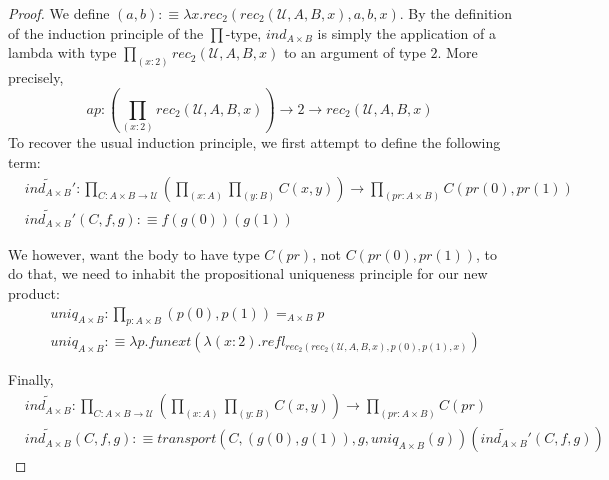 \documentclass{article}
\begin{document}
\begin{proof}
  We define $(a,b) :\equiv \lambda x . rec_2(rec_2(\mathcal{U}, A, B, x), a, b, x)$.
  By the definition of the induction principle of the $\prod$-type, $ind_{A
    \times B}$ is simply the application of a lambda with type $\prod_{(x : 2)}
  rec_2(\mathcal{U}, A, B, x)$ to an argument of type $2$. More precisely,
  \[
    ap : \left( \prod_{(x : 2)} rec_2(\mathcal{U}, A, B, x) \right) \to 2 \to
    rec_2(\mathcal{U}, A, B, x)
  \]
  To recover the usual induction principle, we first attempt to define the
  following term:
  \begin{align*}
    & \widetilde{ind_{A \times B}}' : \prod_{C : A \times B \to \mathcal{U}} \left(\prod_{(x : A)} \prod_{(y : B)} C(x,y) \right) \to \prod_{(pr : A \times B)} C(pr(0), pr(1))\\
    & \widetilde{ind_{A \times B}}'(C, f, g) :\equiv f(g(0))(g(1))
  \end{align*}

  We however, want the body to have type $C(pr)$, not $C(pr(0), pr(1))$, to do
  that, we need to inhabit the propositional uniqueness principle for our new product:
  \begin{align*}
    & uniq_{A \times B} : \prod_{p : A \times B} (p(0), p(1)) =_{A \times B} p\\
    & uniq_{A \times B} :\equiv \lambda p . funext(\lambda (x : 2) . refl_{rec_2(rec_2(\mathcal{U}, A, B, x), p(0), p(1), x)})
  \end{align*}

  Finally,
  \begin{align*}
    & \widetilde{ind_{A \times B}} : \prod_{C : A \times B \to \mathcal{U}} \left( \prod_{(x : A)} \prod_{(y : B)} C(x,y) \right) \to \prod_{(pr : A \times B)} C(pr)\\
    & \widetilde{ind_{A \times B}}(C, f, g)
      :\equiv
      transport( C , (g(0), g(1)), g, uniq_{A \times B}(g))(\widetilde{ind_{A \times B}}'(C, f, g))
  \end{align*}
\end{proof}
\end{document}
